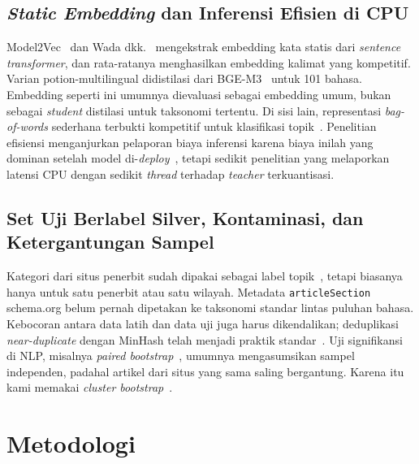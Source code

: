 \documentclass[journal]{IEEEtran}
\newcommand{\eng}[1]{\textit{#1}}   %
\begin{document}
\subsection{\eng{Static Embedding} dan Inferensi Efisien di CPU}
Model2Vec~\cite{tulkens2024model2vec} dan Wada dkk.~\cite{wada2025static} mengekstrak embedding kata statis dari \eng{sentence transformer}, dan rata-ratanya menghasilkan embedding kalimat yang kompetitif. Varian potion-multilingual didistilasi dari BGE-M3~\cite{chen2024bgem3} untuk 101 bahasa. Embedding seperti ini umumnya dievaluasi sebagai embedding umum, bukan sebagai \eng{student} distilasi untuk taksonomi tertentu. Di sisi lain, representasi \eng{bag-of-words} sederhana terbukti kompetitif untuk klasifikasi topik~\cite{galke2022bow}. Penelitian efisiensi menganjurkan pelaporan biaya inferensi karena biaya inilah yang dominan setelah model di-\eng{deploy}~\cite{luccioni2024power}, tetapi sedikit penelitian yang melaporkan latensi CPU dengan sedikit \eng{thread} terhadap \eng{teacher} terkuantisasi.

\subsection{Set Uji Berlabel Silver, Kontaminasi, dan Ketergantungan Sampel}
Kategori dari situs penerbit sudah dipakai sebagai label topik~\cite{mirashi2023indicnews}, tetapi biasanya hanya untuk satu penerbit atau satu wilayah. Metadata \texttt{articleSection} schema.org belum pernah dipetakan ke taksonomi standar lintas puluhan bahasa. Kebocoran antara data latih dan data uji juga harus dikendalikan; deduplikasi \eng{near-duplicate} dengan MinHash telah menjadi praktik standar~\cite{lee2022dedup}. Uji signifikansi di NLP, misalnya \eng{paired bootstrap}~\cite{koehn2004significance}, umumnya mengasumsikan sampel independen, padahal artikel dari situs yang sama saling bergantung. Karena itu kami memakai \eng{cluster bootstrap}~\cite{field2007bootstrapping}.



\section{Metodologi}
\label{sec:method}
\end{document}
